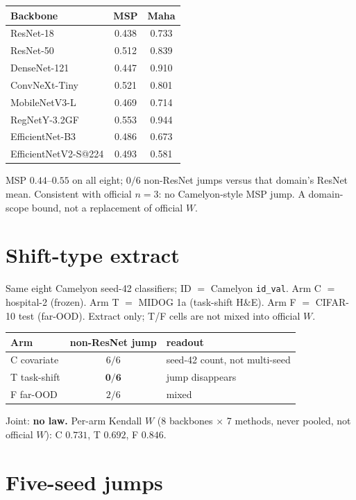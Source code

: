 \documentclass[10pt,twocolumn,letterpaper]{article}
\begin{document}
\begin{center}
\small
\begin{tabular}{@{}lcc@{}}
\toprule
Backbone & MSP & Maha \\
\midrule
ResNet-18 & 0.438 & 0.733 \\
ResNet-50 & 0.512 & 0.839 \\
DenseNet-121 & 0.447 & 0.910 \\
ConvNeXt-Tiny & 0.521 & 0.801 \\
MobileNetV3-L & 0.469 & 0.714 \\
RegNetY-3.2GF & 0.553 & 0.944 \\
EfficientNet-B3 & 0.486 & 0.673 \\
EfficientNetV2-S@224 & 0.493 & 0.581 \\
\bottomrule
\end{tabular}
\end{center}

MSP $0.44$--$0.55$ on all eight; $0/6$ non-ResNet jumps versus that domain's ResNet mean.
Consistent with official $n{=}3$: no Camelyon-style MSP jump.
A domain-scope bound, not a replacement of official $W$.

\section{Shift-type extract}

Same eight Camelyon seed-42 classifiers; ID ${=}$ Camelyon \texttt{id\_val}.
Arm C ${=}$ hospital-2 (frozen).
Arm T ${=}$ MIDOG 1a (task-shift H\&E).
Arm F ${=}$ CIFAR-10 test (far-OOD).
Extract only; T/F cells are not mixed into official $W$.

\begin{center}
\small
\begin{tabular}{@{}lcl@{}}
\toprule
Arm & non-ResNet jump & readout \\
\midrule
C covariate & $6/6$ & seed-42 count, not multi-seed \\
T task-shift & $\mathbf{0/6}$ & jump disappears \\
F far-OOD & $2/6$ & mixed \\
\bottomrule
\end{tabular}
\end{center}

Joint: \textbf{no law.}
Per-arm Kendall $W$ (8 backbones ${\times}$ 7 methods, never pooled, not official $W$): C $0.731$, T $0.692$, F $0.846$.

\section{Five-seed jumps}
\end{document}
